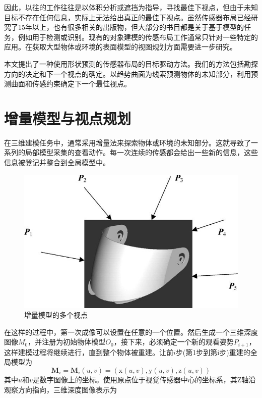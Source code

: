 \documentclass[AutoFakeBold,zihao=-4]{ctexart}
\begin{document}
	因此，以往的工作往往是以体积分析或遮挡为指导，寻找最佳下视点，但由于未知目标不存在任何信息，实际上无法给出真正的最佳下视点。虽然传感器布局已经研究了15年以上，也有很多相关的出版物，但大部分的书目都是关于基于模型的任务，例如用于检测或识别。现有的对象建模的传感布局工作通常只针对一些特定的应用。在获取大型物体或环境的表面模型的视图规划方面需要进一步研究。
	
	本文提出了一种使用形状预测的传感器布局的目标驱动方法。我们的方法包括勘探方向的决定和下一个视点的确定。以趋势曲面为线索预测物体的未知部分，利用预测曲面和传感约束确定下一个最佳视点。
	
	\section{增量模型与视点规划}
	
	在三维建模任务中，通常采用增量法来探索物体或环境的未知部分。这就导致了一系列的局部模型采集的查看动作。每一次连续的传感都会给出一些新的信息，这些信息被登记并整合到全局模型中。

	\begin{figure}[h]
		\centering
		\includegraphics[scale=0.5]{PIC1.jpg}
		\caption{增量模型的多个视点}
		\label{fig-model-point}
	\end{figure}

	在这样的过程中，第一次成像可以设置在任意的一个位置。然后生成一个三维深度图像$ M_{0} $，并注册为初始物体模型$ O_{0} $，接下来，必须确定一个新的观看姿势$ P_{i+1} $，这样建模过程将继续进行，直到整个物体被重建。让前$ i $步(第1步到第i步)重建的全局模型为
	\begin{equation}
		\boldsymbol{M}_{i}=\boldsymbol{M}_{i}(u, v)=(\mathrm{x}(u, v), \mathrm{y}(u, v), \mathrm{z}(u, v))
		\label{eq1}
	\end{equation}
	其中$ u $和$ v $是数字图像上的坐标。使用原点位于视觉传感器中心的坐标系，其Z轴沿观察方向指向，三维深度图像表示为
	
\end{document}
